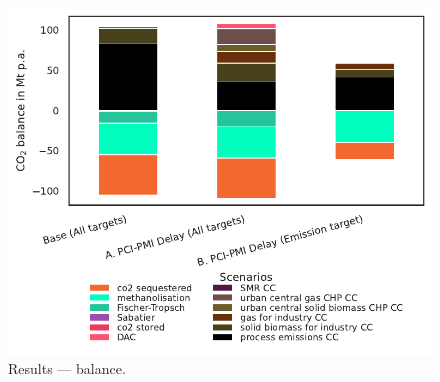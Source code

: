 \documentclass[preprint,12pt]{elsarticle}
\begin{document}
\begin{figure}[htbp]
  \centering
  \includegraphics[width=0.9\linewidth]{co2_balance}
  \caption{Results ---  balance.}
  \label{fig:co2_balance}
\end{figure}
\end{document}
